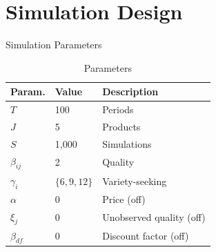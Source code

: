 \documentclass[aspectratio=169,professionalfonts]{beamer}
\newcommand{\E}{\mathbb{E}}
\newcommand{\hl}[1]{\textbf{\textcolor{UGARed}{#1}}}
\begin{document}
%
%
%

\section{Simulation Design}

\begin{frame}{Simulation Parameters}
  \begin{table}
    \centering
    \caption{Parameters}
    \begin{tabular}{lll}
      \toprule
      Param. & Value & Description \\
      \midrule
      $T$         & 100             & Periods \\
      $J$         & 5               & Products \\
      $S$         & 1{,}000         & Simulations \\
      $\beta_{ij}$   & 2             & Quality \\
      $\gamma_i$     & $\{6, 9, 12\}$ & Variety-seeking \\
      $\alpha$    & 0               & Price (off) \\
      $\xi_j$     & 0               & Unobserved quality (off) \\
      $\beta_{df}$    & 0             & Discount factor (off) \\
      \bottomrule
    \end{tabular}
  \end{table}
\end{frame}
\end{document}
